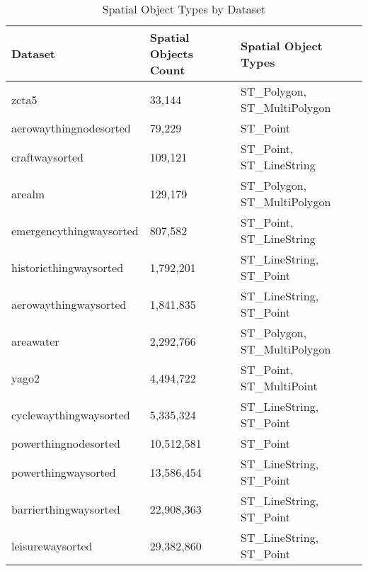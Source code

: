 \documentclass{article}
\begin{document}
\begin{table}
\centering
\caption{Spatial Object Types by Dataset}
\label{tab:spatial-object-types}
\begin{tabular}{l|l|l}
\toprule
Dataset & Spatial Objects Count & Spatial Object Types \\
\midrule
zcta5 & 33,144 & ST\_Polygon, ST\_MultiPolygon \\
aerowaythingnodesorted & 79,229 & ST\_Point \\
craftwaysorted & 109,121 & ST\_Point, ST\_LineString \\
arealm & 129,179 & ST\_Polygon, ST\_MultiPolygon \\
emergencythingwaysorted & 807,582 & ST\_Point, ST\_LineString \\
historicthingwaysorted & 1,792,201 & ST\_LineString, ST\_Point \\
aerowaythingwaysorted & 1,841,835 & ST\_LineString, ST\_Point \\
areawater & 2,292,766 & ST\_Polygon, ST\_MultiPolygon \\
yago2 & 4,494,722 & ST\_Point, ST\_MultiPoint \\
cyclewaythingwaysorted & 5,335,324 & ST\_LineString, ST\_Point \\
powerthingnodesorted & 10,512,581 & ST\_Point \\
powerthingwaysorted & 13,586,454 & ST\_LineString, ST\_Point \\
barrierthingwaysorted & 22,908,363 & ST\_LineString, ST\_Point \\
leisurewaysorted & 29,382,860 & ST\_LineString, ST\_Point \\
\bottomrule
\end{tabular}
\end{table}
\end{document}
